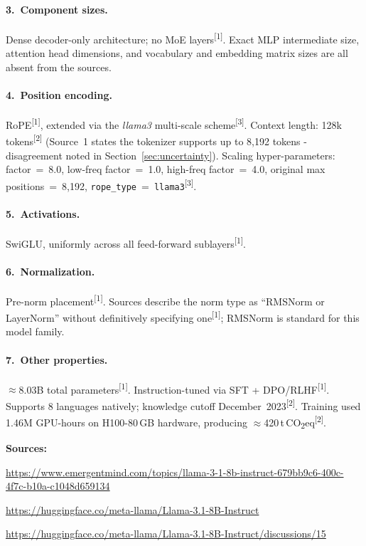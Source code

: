 \documentclass[11pt, a4paper]{article}
\newcommand{\src}[1]{\textsuperscript{\normalfont\small[#1]}}
\begin{document}
\paragraph{3.~Component sizes.}
Dense decoder-only architecture; no MoE layers\src{1}.
Exact MLP intermediate size, attention head dimensions, and vocabulary and
embedding matrix sizes are all absent from the sources.

\paragraph{4.~Position encoding.}
RoPE\src{1}, extended via the \textit{llama3} multi-scale scheme\src{3}.
Context length: 128k tokens\src{2} (Source~1 states the tokenizer supports up to
8,192 tokens - disagreement noted in Section~\ref{sec:uncertainty}).
Scaling hyper-parameters: factor~=~8.0, low-freq factor~=~1.0,
high-freq factor~=~4.0, original max positions~=~8,192,
\texttt{rope\_type}~=~\texttt{llama3}\src{3}.

\paragraph{5.~Activations.}
SwiGLU, uniformly across all feed-forward sublayers\src{1}.

\paragraph{6.~Normalization.}
Pre-norm placement\src{1}.
Sources describe the norm type as ``RMSNorm or LayerNorm'' without definitively
specifying one\src{1}; RMSNorm is standard for this model family.

\paragraph{7.~Other properties.}
$\approx$8.03B total parameters\src{1}.
Instruction-tuned via SFT + DPO/RLHF\src{1}.
Supports 8 languages natively; knowledge cutoff December~2023\src{2}.
Training used 1.46M GPU-hours on H100-80\,GB hardware, producing
$\approx$420\,t\,CO\textsubscript{2}eq\src{2}.

\noindent\textbf{Sources:}
\begin{enumerate}[noitemsep,label=\small{[\arabic*]},leftmargin=*,topsep=2pt]
\item \small\url{https://www.emergentmind.com/topics/llama-3-1-8b-instruct-679bb9c6-400c-4f7c-b10a-c1048d659134}
\item \small\url{https://huggingface.co/meta-llama/Llama-3.1-8B-Instruct}
\item \small\url{https://huggingface.co/meta-llama/Llama-3.1-8B-Instruct/discussions/15}
\end{enumerate}
\end{document}
